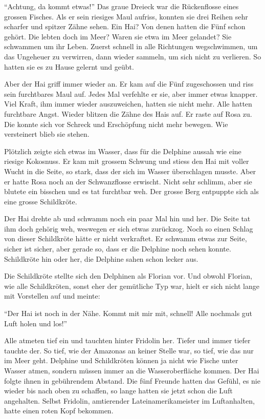 \enquote{Achtung, da kommt etwas!} Das graue Dreieck war die Rückenflosse eines grossen Fisches. Als er sein riesiges Maul aufriss, konnten sie drei Reihen sehr scharfer und spitzer Zähne sehen. Ein Hai? Von denen hatten die Fünf schon gehört. Die lebten doch im Meer? Waren sie etwa im Meer gelandet? Sie schwammen um ihr Leben. Zuerst schnell in alle Richtungen wegschwimmen, um das Ungeheuer zu verwirren, dann wieder sammeln, um sich nicht zu verlieren. So hatten sie es zu Hause gelernt und geübt.

Aber der Hai griff immer wieder an. Er kam auf die Fünf zugeschossen und riss sein furchtbares Maul auf. Jedes Mal verfehlte er sie, aber immer etwas knapper. Viel Kraft, ihm immer wieder auszuweichen, hatten sie nicht mehr. Alle hatten furchtbare Angst. Wieder blitzen die Zähne des Hais auf. Er raste auf Rosa zu. Die konnte sich vor Schreck und Erschöpfung nicht mehr bewegen. Wie versteinert blieb sie stehen. 

Plötzlich zeigte sich etwas im Wasser, dass für die Delphine aussah wie eine riesige Kokosnuss. Er kam mit grossem Schwung und stiess den Hai mit voller Wucht in die Seite, so stark, dass der sich im Wasser überschlagen musste.  Aber er hatte Rosa noch an der Schwanzflosse erwischt. Nicht sehr schlimm, aber sie blutete ein bisschen und es tat furchtbar weh. Der grosse Berg entpuppte sich als eine grosse Schildkröte. 

Der Hai drehte ab und schwamm noch ein paar Mal hin und her. Die Seite tat ihm doch gehörig weh, weswegen er sich etwas zurückzog. Noch so einen Schlag von dieser Schildkröte hätte er nicht verkraftet. Er schwamm etwas zur Seite, sicher ist sicher, aber gerade so, dass er die Delphine noch sehen konnte. Schildkröte hin oder her, die Delphine sahen schon lecker aus.

Die Schildkröte stellte sich den Delphinen als Florian vor. Und obwohl Florian, wie alle Schildkröten, sonst eher der gemütliche Typ war, hielt er sich nicht lange mit Vorstellen auf und meinte: 

\enquote{Der Hai ist noch in der Nähe. Kommt mit mir mit, schnell! Alle nochmals gut Luft holen und los!}

Alle atmeten tief ein und tauchten hinter Fridolin her. Tiefer und immer tiefer tauchte der. So tief, wie der Amazonas an keiner Stelle war, so tief, wie das nur im Meer geht. Delphine und Schildkröten können ja nicht wie Fische unter Wasser atmen, sondern müssen immer an die Wasseroberfläche kommen. Der Hai folgte ihnen in gebührendem Abstand. Die fünf Freunde hatten das Gefühl, es nie wieder bis nach oben zu schaffen, so lange hatten sie jetzt schon die Luft angehalten. Selbst Fridolin, amtierender Lateinamerikameister im Luftanhalten, hatte einen roten Kopf bekommen. 

